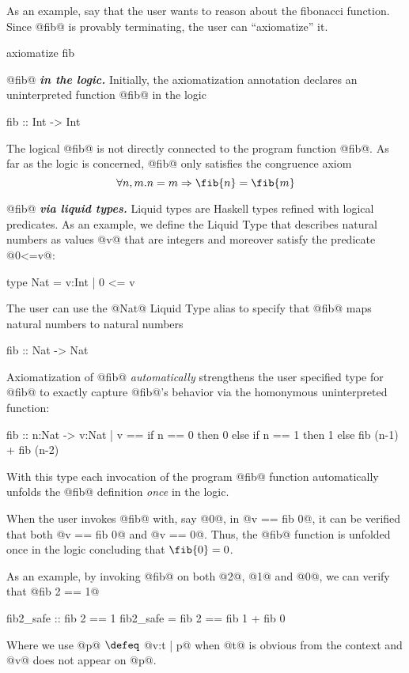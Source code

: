 As an example, say that the user wants to reason about the fibonacci function.
Since @fib@ is provably terminating, the user can ``axiomatize'' it.
\begin{code}
  axiomatize fib
\end{code}

 @fib@ \textbf{\emph{in the logic.}}
Initially, the axiomatization annotation declares an uninterpreted function @fib@ in the logic
\begin{code}
  fib :: Int -> Int
\end{code}
%
The logical @fib@ is not directly connected to the program function @fib@.
As far as the logic is concerned, @fib@ only satisfies the congruence axiom
%
$$\forall n, m. n = m \Rightarrow \fib{n} = \fib{m}$$
%

 @fib@ \textbf{\emph{via liquid types.}}
Liquid types are Haskell types refined with logical predicates.
As an example, we define the Liquid Type that describes natural numbers
as values @v@ that are integers and moreover satisfy the predicate @0<=v@:
\begin{code}
  type Nat = {v:Int | 0 <= v}
\end{code}
%
The user can use the @Nat@ Liquid Type alias to specify that @fib@ maps
natural numbers to natural numbers
\begin{code}
  fib :: Nat -> Nat
\end{code}
%
Axiomatization of @fib@  \textit{automatically} strengthens the user specified type for @fib@ to
exactly capture @fib@'s behavior via the homonymous uninterpreted function:
\begin{code}
  fib :: n:Nat
      -> {v:Nat |
          v == if n == 0 then 0
               else if n == 1 then 1
               else fib (n-1) + fib (n-2)
          }
\end{code}
%
With this type each invocation of the program @fib@ function automatically
unfolds the @fib@ definition \textit{once} in the logic.

When the user invokes @fib@ with, say @0@, in @v == fib 0@,
it can be verified that both @v == fib 0@ and @v == 0@.
Thus, the @fib@ function is unfolded once in the logic concluding that
$\fib{0} = 0$.

As an example, by invoking @fib@ on both @2@, @1@ and @0@, we can verify
that @fib 2 == 1@
\begin{code}
  fib2_safe :: {fib 2 == 1}
  fib2_safe = fib 2 == fib 1 + fib 0
\end{code}
Where we use @{p}@ $\defeq$ @{v:t | p}@ when @t@ is obvious from the context
and @v@ does not appear on @p@.

